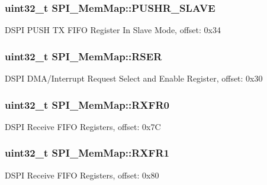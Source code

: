\subsubsection[{P\+U\+S\+H\+R\+\_\+\+S\+L\+A\+V\+E}]{\setlength{\rightskip}{0pt plus 5cm}uint32\+\_\+t S\+P\+I\+\_\+\+Mem\+Map\+::\+P\+U\+S\+H\+R\+\_\+\+S\+L\+A\+V\+E}\label{struct_s_p_i___mem_map_a22553d476505bf3416a55f681a70774e}
D\+S\+P\+I P\+U\+S\+H T\+X F\+I\+F\+O Register In Slave Mode, offset\+: 0x34 \hypertarget{struct_s_p_i___mem_map_ade8f75b925a50f74a9fb2456bc35823d}{}
\subsubsection[{R\+S\+E\+R}]{\setlength{\rightskip}{0pt plus 5cm}uint32\+\_\+t S\+P\+I\+\_\+\+Mem\+Map\+::\+R\+S\+E\+R}\label{struct_s_p_i___mem_map_ade8f75b925a50f74a9fb2456bc35823d}
D\+S\+P\+I D\+M\+A/\+Interrupt Request Select and Enable Register, offset\+: 0x30 \hypertarget{struct_s_p_i___mem_map_ad396a1654fca8d4b350357ebcef159af}{}
\subsubsection[{R\+X\+F\+R0}]{\setlength{\rightskip}{0pt plus 5cm}uint32\+\_\+t S\+P\+I\+\_\+\+Mem\+Map\+::\+R\+X\+F\+R0}\label{struct_s_p_i___mem_map_ad396a1654fca8d4b350357ebcef159af}
D\+S\+P\+I Receive F\+I\+F\+O Registers, offset\+: 0x7\+C \hypertarget{struct_s_p_i___mem_map_a40b7b381e217d2602c20861e371511fd}{}
\subsubsection[{R\+X\+F\+R1}]{\setlength{\rightskip}{0pt plus 5cm}uint32\+\_\+t S\+P\+I\+\_\+\+Mem\+Map\+::\+R\+X\+F\+R1}\label{struct_s_p_i___mem_map_a40b7b381e217d2602c20861e371511fd}
D\+S\+P\+I Receive F\+I\+F\+O Registers, offset\+: 0x80 \hypertarget{struct_s_p_i___mem_map_a3839ee0fb2cf1f0389bdaf447dcd6760}{}
